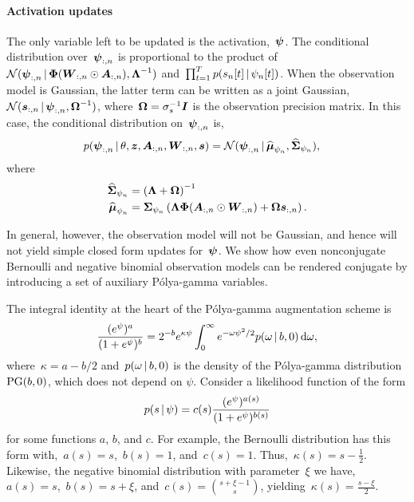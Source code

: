 \paragraph{Activation updates}
The only variable left to be updated is the activation,~$\boldsymbol{\psi}$. The conditional distribution over~$\boldsymbol{\psi}_{:,n}$ is proportional to the product of~$\mathcal{N}(\boldsymbol{\psi}_{:,n} \,|\, \boldsymbol{\Phi} (\boldsymbol{W}_{:,n} \odot \boldsymbol{A}_{:,n}), \boldsymbol{\Lambda}^{-1})$ and~$\prod_{t=1}^T p(s_{n}[t] \,|\, \psi_{n}[t])$. When the observation model is Gaussian, the latter term can be written as a joint Gaussian,~$\mathcal{N}(\boldsymbol{s}_{:,n} \,|\, \boldsymbol{\psi}_{:,n}, \boldsymbol{\Omega}^{-1})$, where~$\boldsymbol{\Omega} = \sigma_s^{-1} \boldsymbol{I}$ is the observation precision matrix. In this case, the conditional distribution on~$\boldsymbol{\psi}_{:,n}$ is,
\begin{align}
p(\boldsymbol{\psi}_{:,n} \,|\, \theta, \boldsymbol{z}, \boldsymbol{A}_{:,n}, \boldsymbol{W}_{:,n}, \boldsymbol{s}) &= 
\mathcal{N}(\boldsymbol{\psi}_{:,n} \,|\, \widehat{\boldsymbol{\mu}}_{\psi_n}, \widehat{\boldsymbol{\Sigma}}_{\psi_n}),
\end{align}
where
\begin{align}
\widehat{\boldsymbol{\Sigma}}_{\psi_n} &= \left( \boldsymbol{\Lambda} + \boldsymbol{\Omega} \right)^{-1}
\\
\widehat{\boldsymbol{\mu}}_{\psi_n} &= \boldsymbol{\Sigma}_{\psi_{n}} \left(\boldsymbol{\Lambda} \boldsymbol{\Phi} (\boldsymbol{A}_{:,n} \odot \boldsymbol{W}_{:,n}) + \boldsymbol{\Omega} \boldsymbol{s}_{:,n} \right).
\end{align}


In general, however, the observation model will not be Gaussian, and hence will not yield simple closed form updates for~$\boldsymbol{\psi}$. We show how even nonconjugate Bernoulli and negative binomial observation models can be rendered conjugate by introducing a set of auxiliary P\'{o}lya-gamma variables.

The integral identity at the heart of the P\'{o}lya-gamma augmentation scheme \cite{polson2013bayesian} is
\begin{equation}
\label{eq:pg_identity}
\frac{(e^{\psi})^a}{(1+e^{\psi})^b} = 2^{-b} e^{\kappa \psi} \int_{0}^{\infty} e^{-\omega \psi^2 /2} p(\omega \,|\, b, 0) \, \mathrm{d}\omega,
\end{equation}
where~${\kappa=a-b/2}$ and~$p(\omega\,|\, b, 0)$ is the density of the P\'{o}lya-gamma
distribution~${\mathrm{PG}(b, 0)}$, which does not depend on $\psi$.
Consider a likelihood function of the form
\begin{equation}
  \label{eq:logit_likelihood}
  p(s \,|\, \psi) = c(s) \frac{(e^\psi)^{a(s)}}{(1+e^\psi)^{b(s)}}
\end{equation}
for some functions $a$, $b$, and $c$.
For example, the Bernoulli distribution has this form with,~$a(s)=s$,~$b(s)=1$, and~$c(s)=1$. Thus,~$\kappa(s)=s-\frac{1}{2}$. Likewise, the negative binomial distribution with parameter~$\xi$ we have,~$a(s)=s$,~$b(s)=s+\xi$, and~$c(s)={s + \xi -1 \choose s}$, yielding~$\kappa(s)=\frac{s-\xi}{2}$.

